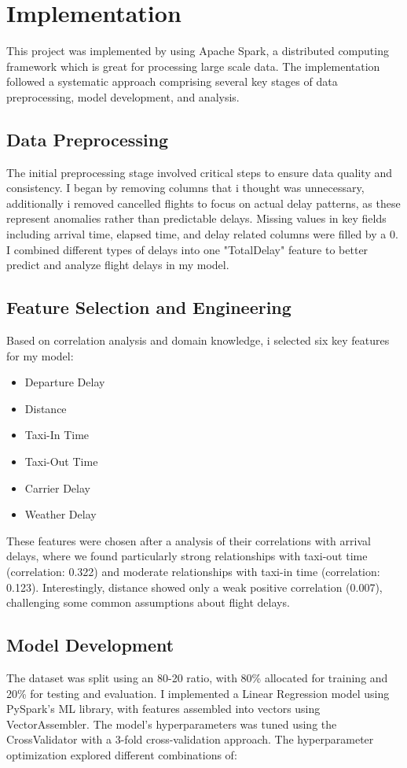 \section{Implementation}
This project was implemented by using Apache Spark, a distributed computing framework which is great for processing large scale data. 
The implementation followed a systematic approach comprising several key stages of data preprocessing, model development, and analysis.

\subsection{Data Preprocessing}
The initial preprocessing stage involved critical steps to ensure data quality and consistency. 
I began by removing columns that i thought was unnecessary, additionally i removed cancelled flights to focus on actual delay patterns, as these represent anomalies rather than predictable delays. 
Missing values in key fields including arrival time, elapsed time, and delay related columns were filled by a 0.
I combined different types of delays into one "TotalDelay" feature to better predict and analyze flight delays in my model.

\subsection{Feature Selection and Engineering}
Based on correlation analysis and domain knowledge, i selected six key features for my model:

\begin{itemize}
\item Departure Delay
\item Distance
\item Taxi-In Time
\item Taxi-Out Time
\item Carrier Delay
\item Weather Delay
\end{itemize}
These features were chosen after a analysis of their correlations with arrival delays, where we found particularly strong relationships with taxi-out time (correlation: 0.322) and moderate relationships with taxi-in time (correlation: 0.123). Interestingly, distance showed only a weak positive correlation (0.007), challenging some common assumptions about flight delays.

\subsection{Model Development}
The dataset was split using an 80-20 ratio, with 80\% allocated for training and 20\% for testing and evaluation. I implemented a Linear Regression model using PySpark's ML library, with features assembled into vectors using VectorAssembler. 
The model's hyperparameters was tuned using the CrossValidator with a 3-fold cross-validation approach.
The hyperparameter optimization explored different combinations of:

